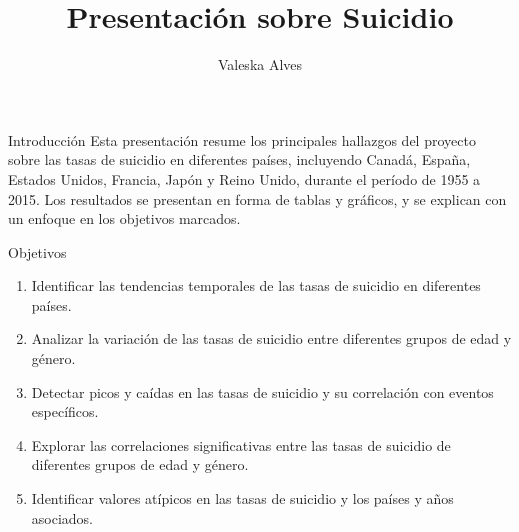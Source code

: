 \documentclass[
  ignorenonframetext,
]{beamer}
\title{Presentación sobre Suicidio}
\author{Valeska Alves}
\date{}
\begin{document}
\frame{\titlepage}

\begin{frame}{Introducción}
\protect\hypertarget{introducciuxf3n}{}
Esta presentación resume los principales hallazgos del proyecto sobre
las tasas de suicidio en diferentes países, incluyendo Canadá, España,
Estados Unidos, Francia, Japón y Reino Unido, durante el período de 1955
a 2015. Los resultados se presentan en forma de tablas y gráficos, y se
explican con un enfoque en los objetivos marcados.
\end{frame}

\begin{frame}{Objetivos}
\protect\hypertarget{objetivos}{}
\begin{enumerate}
\item
  Identificar las tendencias temporales de las tasas de suicidio en
  diferentes países.
\item
  Analizar la variación de las tasas de suicidio entre diferentes grupos
  de edad y género.
\item
  Detectar picos y caídas en las tasas de suicidio y su correlación con
  eventos específicos.
\item
  Explorar las correlaciones significativas entre las tasas de suicidio
  de diferentes grupos de edad y género.
\item
  Identificar valores atípicos en las tasas de suicidio y los países y
  años asociados.
\end{enumerate}
\end{frame}
\end{document}
